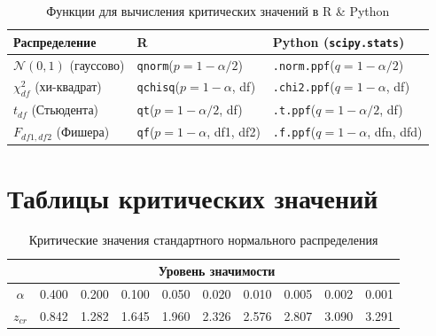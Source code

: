 \documentclass[12pt]{article}
\begin{document}
\begin{landscape}
\begin{table}[ht]
\caption{Функции для вычисления критических значений в R \& Python}
\begin{center}
\begin{tabular}{|l|l|l|}\hline
	Распределение & R & Python (\texttt{scipy.stats}) \\
	\hline\hline
	\(\mathcal{N}(0,1)\) (гауссово) & \texttt{qnorm}($p=1-\alpha/2$) & \texttt{.norm.ppf}($q=1-\alpha/2$)\\ \hline
	\(\chi^2_{df}\) (хи-квадрат) & \texttt{qchisq}($p=1-\alpha$, df) & \texttt{.chi2.ppf}($q=1-\alpha$, df) \\ \hline
	\(t_{df}\) (Стьюдента) & \texttt{qt}($p=1-\alpha/2$, df) & \texttt{.t.ppf}($q=1-\alpha/2$, df) \\ \hline
	\(F_{df1,df2}\) (Фишера) & \texttt{qf}($p=1-\alpha$, df1, df2) & \texttt{.f.ppf}($q=1-\alpha$, dfn, dfd) \\
	\hline
\end{tabular}
\end{center}
\end{table}

\end{landscape}

\newpage

\section{Таблицы критических значений}

\begin{table}[ht]
\caption{Критические значения стандартного нормального распределения}
\begin{tabular}{|c|c|c|c|c|c|c|c|c|c|}
	\hline
	& \multicolumn{9}{c|}{Уровень значимости } \\ \hline
	$\alpha$ &  0.400 &  0.200 &  0.100 &  0.050 &  0.020 &  0.010 & 0.005 &0.002 & 0.001\\ \hline
	$z_{cr}$ &  0.842 &  1.282 &  1.645 &  1.960 & 2.326& 2.576& 2.807& 3.090 & 3.291\\
	\hline
\end{tabular}
\end{table}

\end{document}

